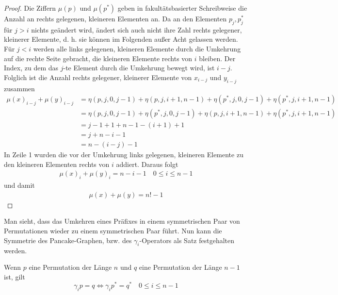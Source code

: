 \documentclass[a4paper, 10pt, ngerman]{article}
\begin{document}
\begin{proof}
    Die Ziffern $\mu(p)$ und $\mu(p^*)$ geben in fakultätsbasierter Schreibweise die Anzahl an rechts gelegenen, kleineren Elementen an. Da an den Elementen $p_j, p^*_j$ für $j > i$ nichts geändert wird, ändert sich auch nicht ihre Zahl rechts gelegener, kleinerer Elemente, d. h. sie können im Folgenden außer Acht gelassen werden. Für $j < i$ werden alle links gelegenen, kleineren Elemente durch die Umkehrung auf die rechte Seite gebracht, die kleineren Elemente rechts von $i$ bleiben. Der Index, zu dem das $j$-te Element durch die Umkehrung bewegt wird, ist $i - j$. Folglich ist die Anzahl rechts gelegener, kleinerer Elemente von $x_{i - j}$ und $y_{i - j}$ zusammen
    \begin{align*}
        \mu(x)_{i - j} + \mu(y)_{i - j}
         & = \eta(p, j, 0, j - 1) + \eta(p, j, i + 1, n - 1) + \eta(p^*, j, 0, j - 1) + \eta(p^*, j, i + 1, n - 1) \\
         & = \eta(p, j, 0, j - 1) + \eta(p^*, j, 0, j - 1) + \eta(p, j, i + 1, n - 1) + \eta(p^*, j, i + 1, n - 1) \\
         & = j - 1 + 1 + n - 1 - (i + 1) + 1                                                                       \\
         & = j + n - i - 1                                                                                         \\
         & = n - (i - j) - 1
    \end{align*}
    In Zeile 1 wurden die vor der Umkehrung links gelegenen, kleineren Elemente zu den kleineren Elementen rechts von $i$ addiert. Daraus folgt
    \begin{align*}
        \mu(x)_i + \mu(y)_i = n - i - 1 \quad 0 \le i \le n - 1
    \end{align*}
    und damit
    \begin{align*}
        \mu(x) + \mu(y) = n! - 1
    \end{align*}
\end{proof}

Man sieht, dass das Umkehren eines Präfixes in einem symmetrischen Paar von Permutationen wieder zu einem symmetrischen Paar führt. Nun kann die Symmetrie des Pancake-Graphen, bzw. des $\gamma_i$-Operators als Satz festgehalten werden.

\begin{theorem}
    Wenn $p$ eine Permutation der Länge $n$ und $q$ eine Permutation der Länge $n - 1$ ist, gilt
    $$
        \gamma_i p = q \Longleftrightarrow \gamma_i p^* = q^* \quad 0 \le i \le n - 1
    $$
\end{theorem}
\end{document}
